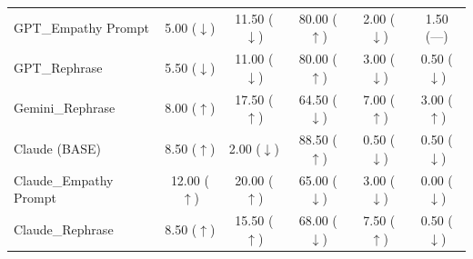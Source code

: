 \begin{table}
{\begin{tabular}{lccccc}
GPT\_Empathy Prompt
& 5.00 ({\color{blue}$\downarrow$}) 
& 11.50 ({\color{blue}$\downarrow$}) 
& 80.00 ({\color{red}$\uparrow$}) 
& 2.00 ({\color{blue}$\downarrow$}) 
& 1.50 ({\color{gray}---}) 
\\

GPT\_Rephrase
& 5.50 ({\color{blue}$\downarrow$}) 
& 11.00 ({\color{blue}$\downarrow$}) 
& 80.00 ({\color{red}$\uparrow$}) 
& 3.00 ({\color{blue}$\downarrow$}) 
& 0.50 ({\color{blue}$\downarrow$}) 
\\

Gemini\_Rephrase
& 8.00 ({\color{red}$\uparrow$}) 
& 17.50 ({\color{red}$\uparrow$}) 
& 64.50 ({\color{blue}$\downarrow$}) 
& 7.00 ({\color{red}$\uparrow$}) 
& 3.00 ({\color{red}$\uparrow$}) 
\\

Claude (BASE)
& 8.50 ({\color{red}$\uparrow$}) 
& 2.00 ({\color{blue}$\downarrow$}) 
& 88.50 ({\color{red}$\uparrow$}) 
& 0.50 ({\color{blue}$\downarrow$}) 
& 0.50 ({\color{blue}$\downarrow$}) 
\\

Claude\_Empathy Prompt
& 12.00 ({\color{red}$\uparrow$}) 
& 20.00 ({\color{red}$\uparrow$}) 
& 65.00 ({\color{blue}$\downarrow$}) 
& 3.00 ({\color{blue}$\downarrow$}) 
& 0.00 ({\color{blue}$\downarrow$}) 
\\

Claude\_Rephrase
& 8.50 ({\color{red}$\uparrow$}) 
& 15.50 ({\color{red}$\uparrow$}) 
& 68.00 ({\color{blue}$\downarrow$}) 
& 7.50 ({\color{red}$\uparrow$}) 
& 0.50 ({\color{blue}$\downarrow$}) 
\\

\bottomrule
\end{tabular}}
\end{table}

